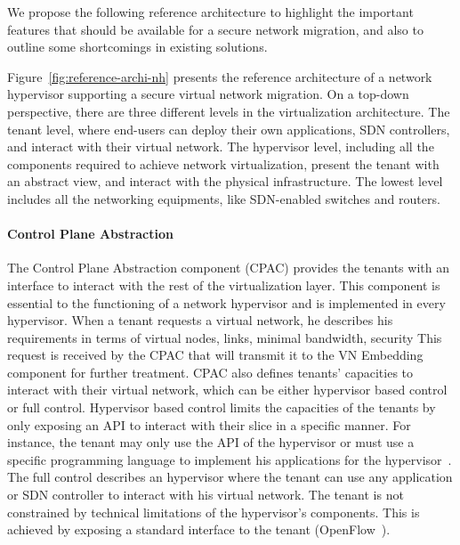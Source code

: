 We propose the following reference architecture to highlight the important features that should be available for a secure network migration, and also to outline some shortcomings in existing solutions.


  
Figure~\ref{fig:reference-archi-nh} presents the reference architecture of a network hypervisor supporting a secure virtual network migration.
On a top-down perspective, there are three different levels in the virtualization architecture.
The tenant level, where end-users can deploy their own applications, SDN controllers, and interact with their virtual network.
The hypervisor level, including all the components required to achieve network virtualization, present the tenant with an abstract view, and interact with the physical infrastructure.
The lowest level includes all the networking equipments, like SDN-enabled switches and routers.

\paragraph{Control Plane Abstraction}
The Control Plane Abstraction component (CPAC) provides the tenants with an interface to interact with the rest of the virtualization layer.
This component is essential to the functioning of a network hypervisor and is implemented in every hypervisor.
When a tenant requests a virtual network, he describes his requirements in terms of virtual nodes, links, minimal bandwidth, security \etc This request is received by the CPAC that will transmit it to the VN Embedding component for further treatment.
CPAC also defines tenants' capacities to interact with their virtual network, which can be either hypervisor based control or full control.
Hypervisor based control limits the capacities of the tenants by only exposing an API to interact with their slice in a specific manner. For instance, the tenant may only use the API of the hypervisor or must use a specific programming language to implement his applications for the hypervisor~\cite{FlowN-Drutskoy2012,NetworkHypervisor-Huang2013}. 
The full control describes an hypervisor where the tenant can use any application or SDN controller to interact with his virtual network. The tenant is not constrained by technical limitations of the hypervisor's components.
This is achieved by exposing a standard interface to the tenant (\eg OpenFlow~\cite{Openflow-McKeown2008}).



